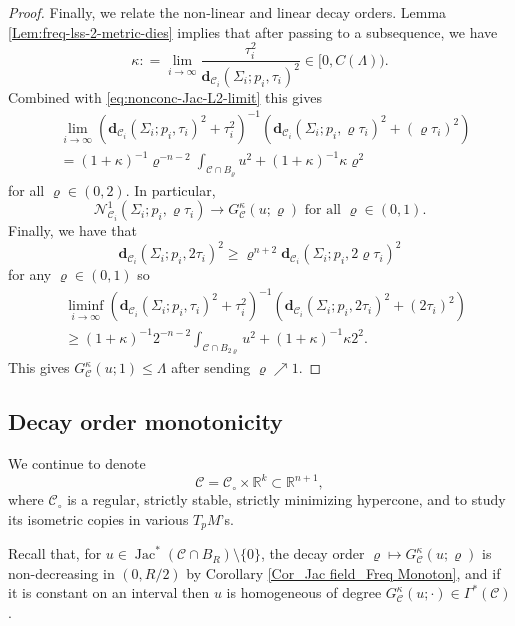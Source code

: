 \documentclass[11pt, letterpaper, reqno]{amsart}
\numberwithin{equation}{section}
\theoremstyle{remark}
\newcommand{\RR}{\mathbb{R}}
\newcommand{\cC}{\mathcal{C}}
\newcommand{\cN}{\mathcal{N}}
\newcommand{\mbfd}{\mathbf{d}}
\newcommand{\Jac}{\operatorname{Jac}}
\begin{document}
\begin{proof}
Finally, we relate the non-linear and linear decay orders. Lemma \ref{Lem:freq-lss-2-metric-dies} implies that after passing to a subsequence, we have
\[
\kappa : = \lim_{i\to\infty} \frac{\tau_i^2}{\mbfd_{\cC_i}(\Sigma_i;p_i,\tau_i)^2}  \in [0,C(\Lambda)). 
\]
Combined with \eqref{eq:nonconc-Jac-L2-limit} this gives 
\begin{align*}
& \lim_{i\to\infty} (\mbfd_{\cC_i}(\Sigma_i;p_i,\tau_i)^{2} + \tau_i^2)^{-1}(\mbfd_{\cC_i}(\Sigma_i;p_i,\varrho \tau_i)^2 + (\varrho \tau_i)^2) \\
& = (1+\kappa)^{-1} \varrho^{-n-2} \int_{\cC \cap B_\varrho} u^2 + (1+\kappa)^{-1} \kappa \varrho^2
\end{align*}
for all $\varrho \in (0,2)$. In particular,
\[
\cN^{1}_{\cC_i}(\Sigma_i; p_i, \varrho\tau_i) \to G_\cC^\kappa(u;\varrho) \text{ for all } \varrho \in (0, 1). 
\]
Finally, we have that 
\[
\mbfd_{\cC_i}(\Sigma_i;p_i,2\tau_i)^2 \geq \varrho^{n+2} \mbfd_{\cC_i}(\Sigma_i;p_i,2\varrho \tau_i)^2 
\]
for any $\varrho \in (0,1)$ so 
\begin{align*}
& \liminf_{i\to\infty} (\mbfd_{\cC_i}(\Sigma_i;p_i,\tau_i)^{2} + \tau_i^2)^{-1}(\mbfd_{\cC_i}(\Sigma_i;p_i,2\tau_i)^2 + (2\tau_i)^2) \\
& \geq (1+\kappa)^{-1}  2^{-n-2}  \int_{\cC \cap B_{2\varrho}} u^2 + (1+\kappa)^{-1} \kappa 2^2.
\end{align*}
This gives $G_\cC^\kappa(u;1) \leq \Lambda$ after sending $\varrho \nearrow 1$. 
\end{proof}

\subsection{Decay order monotonicity} 

We continue to denote
\[ \cC = \cC_\circ \times \RR^k \subset \RR^{n+1}, \]
where $\cC_\circ$ is a regular, strictly stable, strictly minimizing hypercone, and to study its isometric copies in various $T_p M$'s.

Recall that, for $u \in \Jac^*(\cC \cap B_R) \setminus \{ 0 \}$, the decay order $\varrho \mapsto G^\kappa_\cC(u;\varrho)$ is non-decreasing in $(0, R/2)$ by Corollary \ref{Cor_Jac field_Freq Monoton}, and if it is constant on an interval then $u$ is homogeneous of degree $G^\kappa_\cC(u;\cdot) \in \Gamma^*(\cC)$.
\end{document}

